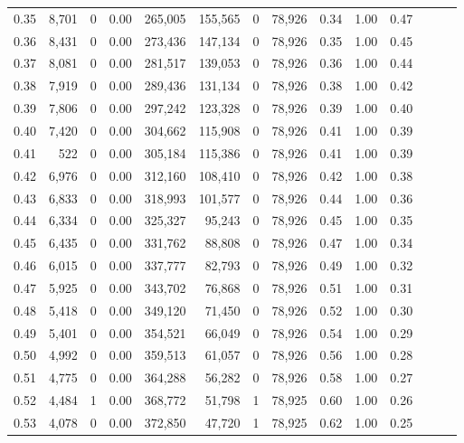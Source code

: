\begin{tabular}{rrrrrrrrrrrrrr}
0.35 &  8,701 &      0 &  0.00 &  265,005 &  155,565 &       0 &  78,926 &  0.34 &  1.00 &      0.47 \\
0.36 &  8,431 &      0 &  0.00 &  273,436 &  147,134 &       0 &  78,926 &  0.35 &  1.00 &      0.45 \\
0.37 &  8,081 &      0 &  0.00 &  281,517 &  139,053 &       0 &  78,926 &  0.36 &  1.00 &      0.44 \\
0.38 &  7,919 &      0 &  0.00 &  289,436 &  131,134 &       0 &  78,926 &  0.38 &  1.00 &      0.42 \\
0.39 &  7,806 &      0 &  0.00 &  297,242 &  123,328 &       0 &  78,926 &  0.39 &  1.00 &      0.40 \\
0.40 &  7,420 &      0 &  0.00 &  304,662 &  115,908 &       0 &  78,926 &  0.41 &  1.00 &      0.39 \\
0.41 &    522 &      0 &  0.00 &  305,184 &  115,386 &       0 &  78,926 &  0.41 &  1.00 &      0.39 \\
0.42 &  6,976 &      0 &  0.00 &  312,160 &  108,410 &       0 &  78,926 &  0.42 &  1.00 &      0.38 \\
0.43 &  6,833 &      0 &  0.00 &  318,993 &  101,577 &       0 &  78,926 &  0.44 &  1.00 &      0.36 \\
0.44 &  6,334 &      0 &  0.00 &  325,327 &   95,243 &       0 &  78,926 &  0.45 &  1.00 &      0.35 \\
0.45 &  6,435 &      0 &  0.00 &  331,762 &   88,808 &       0 &  78,926 &  0.47 &  1.00 &      0.34 \\
0.46 &  6,015 &      0 &  0.00 &  337,777 &   82,793 &       0 &  78,926 &  0.49 &  1.00 &      0.32 \\
0.47 &  5,925 &      0 &  0.00 &  343,702 &   76,868 &       0 &  78,926 &  0.51 &  1.00 &      0.31 \\
0.48 &  5,418 &      0 &  0.00 &  349,120 &   71,450 &       0 &  78,926 &  0.52 &  1.00 &      0.30 \\
0.49 &  5,401 &      0 &  0.00 &  354,521 &   66,049 &       0 &  78,926 &  0.54 &  1.00 &      0.29 \\
0.50 &  4,992 &      0 &  0.00 &  359,513 &   61,057 &       0 &  78,926 &  0.56 &  1.00 &      0.28 \\
0.51 &  4,775 &      0 &  0.00 &  364,288 &   56,282 &       0 &  78,926 &  0.58 &  1.00 &      0.27 \\
0.52 &  4,484 &      1 &  0.00 &  368,772 &   51,798 &       1 &  78,925 &  0.60 &  1.00 &      0.26 \\
0.53 &  4,078 &      0 &  0.00 &  372,850 &   47,720 &       1 &  78,925 &  0.62 &  1.00 &      0.25 \\

\end{tabular}

